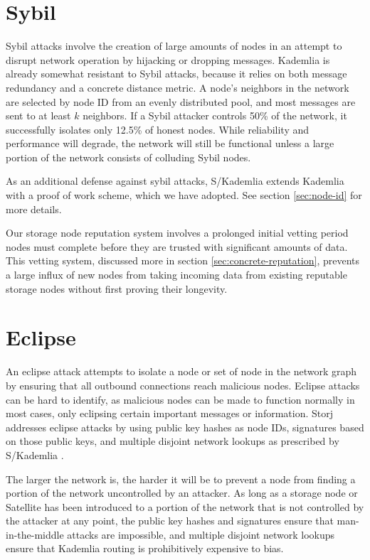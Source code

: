 \documentclass[8pt,fleqn,openany]{book}
\begin{document}
\section{Sybil}

Sybil attacks involve the creation of large amounts of nodes in an attempt to
disrupt network operation by hijacking or dropping messages. Kademlia
\cite{kad} is already somewhat resistant to Sybil attacks, because
it relies on both message redundancy and a concrete distance metric.
A node's neighbors in the network are selected by
node ID from an evenly distributed pool, and most messages are sent to at least
$k$ neighbors. If a Sybil attacker controls 50\% of the network, it
successfully isolates only 12.5\% of honest nodes. While reliability and
performance will degrade, the network will still be functional unless a large
portion of the network consists of colluding Sybil nodes.

As an additional defense against sybil attacks, S/Kademlia \cite{skad}
extends Kademlia with a proof of work scheme, which we have adopted. See section
\ref{sec:node-id} for more details.

Our storage node reputation system involves a prolonged initial vetting
period nodes must complete before they are trusted with significant amounts
of data. This vetting system, discussed more in section
\ref{sec:concrete-reputation}, prevents a large influx of new nodes from taking
incoming data from existing reputable storage nodes without first proving
their longevity.

\section{Eclipse}

An eclipse attack attempts to isolate a node or set of node in the network
graph by ensuring that all outbound connections reach malicious nodes. Eclipse
attacks can be hard to identify, as malicious nodes can be made to function
normally in most cases, only eclipsing certain important messages or
information. Storj addresses eclipse attacks by using public key hashes as node
IDs, signatures based on those public keys, and multiple disjoint network
lookups as prescribed by S/Kademlia \cite{skad}.

The larger the network is, the harder it will
be to prevent a node from finding a portion of the network uncontrolled by
an attacker.
As long as a storage node or Satellite has been introduced to a portion of
the network that is not controlled by the attacker at any point, the public
key hashes and signatures ensure that man-in-the-middle attacks are impossible,
and multiple disjoint network lookups ensure that Kademlia routing is
prohibitively expensive to bias.
\end{document}
